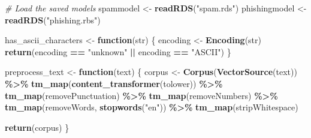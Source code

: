 \documentclass[
]{article}
\newenvironment{Shaded}{\begin{snugshade}}{\end{snugshade}}
\newcommand{\CommentTok}[1]{\textcolor[rgb]{0.56,0.35,0.01}{\textit{#1}}}
\newcommand{\ControlFlowTok}[1]{\textcolor[rgb]{0.13,0.29,0.53}{\textbf{#1}}}
\newcommand{\FunctionTok}[1]{\textcolor[rgb]{0.13,0.29,0.53}{\textbf{#1}}}
\newcommand{\NormalTok}[1]{#1}
\newcommand{\OtherTok}[1]{\textcolor[rgb]{0.56,0.35,0.01}{#1}}
\newcommand{\SpecialCharTok}[1]{\textcolor[rgb]{0.81,0.36,0.00}{\textbf{#1}}}
\newcommand{\StringTok}[1]{\textcolor[rgb]{0.31,0.60,0.02}{#1}}
\begin{document}
\begin{Shaded}
\begin{Highlighting}[]
\CommentTok{\# Load the saved models}
\NormalTok{spammodel }\OtherTok{\textless{}{-}} \FunctionTok{readRDS}\NormalTok{(}\StringTok{"spam.rds"}\NormalTok{)}
\NormalTok{phishingmodel }\OtherTok{\textless{}{-}} \FunctionTok{readRDS}\NormalTok{(}\StringTok{"phishing.rbs"}\NormalTok{)}

\NormalTok{has\_ascii\_characters }\OtherTok{\textless{}{-}} \ControlFlowTok{function}\NormalTok{(str) \{}
\NormalTok{  encoding }\OtherTok{\textless{}{-}} \FunctionTok{Encoding}\NormalTok{(str)}
  \FunctionTok{return}\NormalTok{(encoding }\SpecialCharTok{==} \StringTok{"unknown"} \SpecialCharTok{||}\NormalTok{ encoding }\SpecialCharTok{==} \StringTok{"ASCII"}\NormalTok{)}
\NormalTok{\}}

\NormalTok{preprocess\_text }\OtherTok{\textless{}{-}} \ControlFlowTok{function}\NormalTok{(text) \{}
\NormalTok{  corpus }\OtherTok{\textless{}{-}} \FunctionTok{Corpus}\NormalTok{(}\FunctionTok{VectorSource}\NormalTok{(text)) }\SpecialCharTok{\%\textgreater{}\%}
    \FunctionTok{tm\_map}\NormalTok{(}\FunctionTok{content\_transformer}\NormalTok{(tolower)) }\SpecialCharTok{\%\textgreater{}\%}
    \FunctionTok{tm\_map}\NormalTok{(removePunctuation) }\SpecialCharTok{\%\textgreater{}\%}
    \FunctionTok{tm\_map}\NormalTok{(removeNumbers) }\SpecialCharTok{\%\textgreater{}\%}
    \FunctionTok{tm\_map}\NormalTok{(removeWords, }\FunctionTok{stopwords}\NormalTok{(}\StringTok{"en"}\NormalTok{)) }\SpecialCharTok{\%\textgreater{}\%}
    \FunctionTok{tm\_map}\NormalTok{(stripWhitespace)}
  
  \FunctionTok{return}\NormalTok{(corpus)}
\NormalTok{\}}


\end{Highlighting}
\end{Shaded}
\end{document}

